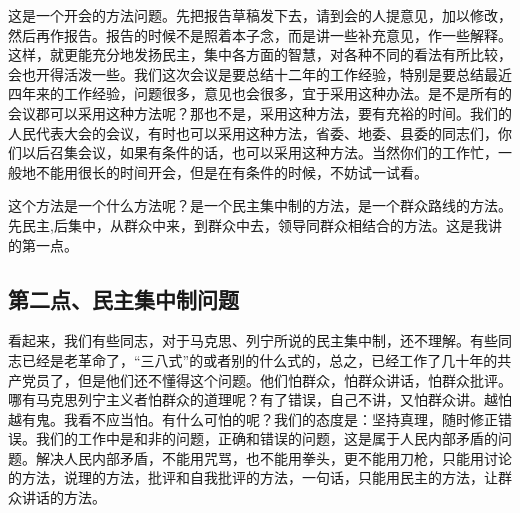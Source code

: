 这是一个开会的方法问题。先把报告草稿发下去，请到会的人提意见，加以修改，然后再作报告。报告的时候不是照着本子念，而是讲一些补充意见，作一些解释。这样，就更能充分地发扬民主，集中各方面的智慧，对各种不同的看法有所比较，会也开得活泼一些。我们这次会议是要总结十二年的工作经验，特别是要总结最近四年来的工作经验，问题很多，意见也会很多，宜于采用这种办法。是不是所有的会议郡可以采用这种方法呢？那也不是，采用这种方法，要有充裕的时间。我们的人民代表大会的会议，有时也可以采用这种方法，省委、地委、县委的同志们，你们以后召集会议，如果有条件的话，也可以采用这种方法。当然你们的工作忙，一般地不能用很长的时间开会，但是在有条件的时候，不妨试一试看。

这个方法是一个什么方法呢？是一个民主集中制的方法，是一个群众路线的方法。先民主,后集中，从群众中来，到群众中去，领导同群众相结合的方法。这是我讲的第一点。

\subsection{第二点、民主集中制问题}

看起来，我们有些同志，对于马克思、列宁所说的民主集中制，还不理解。有些同志已经是老革命了，“三八式”的或者别的什么式的，总之，已经工作了几十年的共产党员了，但是他们还不懂得这个问题。他们怕群众，怕群众讲话，怕群众批评。哪有马克思列宁主义者怕群众的道理呢？有了错误，自己不讲，又怕群众讲。越怕越有鬼。我看不应当怕。有什么可怕的呢？我们的态度是：坚持真理，随时修正错误。我们的工作中是和非的问题，正确和错误的问题，这是属于人民内部矛盾的问题。解决人民内部矛盾，不能用咒骂，也不能用拳头，更不能用刀枪，只能用讨论的方法，说理的方法，批评和自我批评的方法，一句话，只能用民主的方法，让群众讲话的方法。

